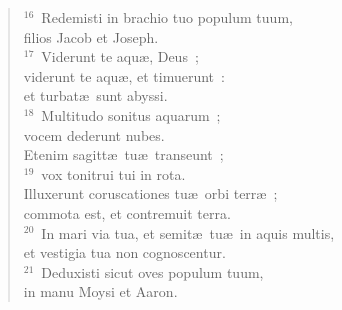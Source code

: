\begin{flushleft}
\begin{verse}
${}^{16}$~Redemisti in brachio tuo populum tuum,\\ filios Jacob et Joseph.\\
${}^{17}$~Viderunt te aqu\ae , Deus~;\\ viderunt te aqu\ae , et timuerunt~:\\ et turbat\ae\ sunt abyssi.\\
${}^{18}$~Multitudo sonitus aquarum~;\\ vocem dederunt nubes.\\ Etenim sagitt\ae\ tu\ae\ transeunt~;\\
${}^{19}$~vox tonitrui tui in rota.\\ Illuxerunt coruscationes tu\ae\ orbi terr\ae~;\\ commota est, et contremuit terra.\\
${}^{20}$~In mari via tua, et semit\ae\ tu\ae\ in aquis multis,\\ et vestigia tua non cognoscentur.\\
${}^{21}$~Deduxisti sicut oves populum tuum,\\ in manu Moysi et Aaron.\end{verse}\end{flushleft}


